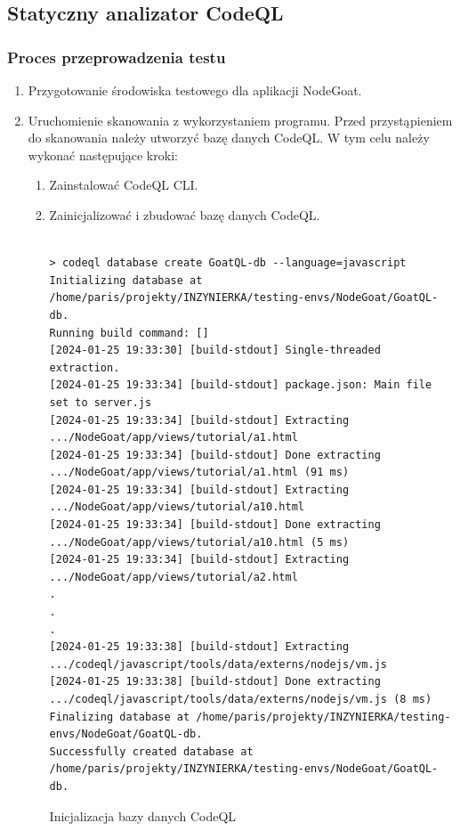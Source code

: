 \normalsize
\subsection{Statyczny analizator CodeQL}\label{subsec:codeql}

\subsubsection{Proces przeprowadzenia testu}

\begin{enumerate}
    \item Przygotowanie środowiska testowego dla aplikacji NodeGoat.
    
    

    \item Uruchomienie skanowania z wykorzystaniem programu.
    Przed przystąpieniem do skanowania należy utworzyć bazę danych CodeQL. W tym celu należy wykonać następujące kroki:
    \begin{enumerate}
        \item Zainstalować CodeQL CLI.
        \item Zainicjalizować i zbudować bazę danych CodeQL. \\\\
          \begin{listing}
            \begin{verbatim}
> codeql database create GoatQL-db --language=javascript  
Initializing database at /home/paris/projekty/INZYNIERKA/testing-envs/NodeGoat/GoatQL-db.
Running build command: []
[2024-01-25 19:33:30] [build-stdout] Single-threaded extraction.
[2024-01-25 19:33:34] [build-stdout] package.json: Main file set to server.js
[2024-01-25 19:33:34] [build-stdout] Extracting .../NodeGoat/app/views/tutorial/a1.html
[2024-01-25 19:33:34] [build-stdout] Done extracting .../NodeGoat/app/views/tutorial/a1.html (91 ms)
[2024-01-25 19:33:34] [build-stdout] Extracting .../NodeGoat/app/views/tutorial/a10.html
[2024-01-25 19:33:34] [build-stdout] Done extracting .../NodeGoat/app/views/tutorial/a10.html (5 ms)
[2024-01-25 19:33:34] [build-stdout] Extracting .../NodeGoat/app/views/tutorial/a2.html
.
.
.
[2024-01-25 19:33:38] [build-stdout] Extracting .../codeql/javascript/tools/data/externs/nodejs/vm.js
[2024-01-25 19:33:38] [build-stdout] Done extracting .../codeql/javascript/tools/data/externs/nodejs/vm.js (8 ms)
Finalizing database at /home/paris/projekty/INZYNIERKA/testing-envs/NodeGoat/GoatQL-db.
Successfully created database at /home/paris/projekty/INZYNIERKA/testing-envs/NodeGoat/GoatQL-db.
        \end{verbatim}
        \caption{Inicjalizacja bazy danych CodeQL}
        \label{listing:codeql-db-init}
        \end{listing}
        

\end{enumerate}
\end{enumerate}
